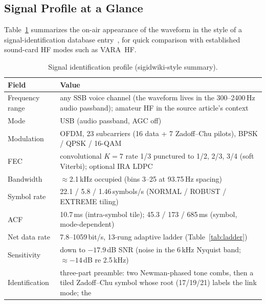 \subsection{Signal Profile at a Glance}
\label{sec:signal_profile}

Table~\ref{tab:signal_profile} summarizes the on-air appearance of the
waveform in the style of a signal-identification database
entry~\cite{sigidwiki_vara}, for quick comparison with established
sound-card HF modes such as VARA~HF.

\begin{table}[H]
    \centering
    \caption{Signal identification profile (sigidwiki-style summary).}
    \label{tab:signal_profile}
    \small
    \begin{tabular}{@{}lp{9.2cm}@{}}
    \toprule
    \textbf{Field} & \textbf{Value} \\
    \midrule
    Frequency range   & any SSB voice channel (the waveform lives in the
                        300--2400\,Hz audio passband); amateur HF in the
                        source article's context \\
    Mode              & USB (audio passband, AGC off) \\
    Modulation        & OFDM, 23 subcarriers (16 data + 7 Zadoff--Chu
                        pilots), BPSK / QPSK / 16-QAM \\
    FEC               & convolutional $K{=}7$ rate 1/3 punctured to
                        1/2, 2/3, 3/4 (soft Viterbi); optional IRA LDPC \\
    Bandwidth         & $\approx$2.1\,kHz occupied (bins 3--25 at
                        93.75\,Hz spacing) \\
    Symbol rate       & 22.1 / 5.8 / 1.46\,symbols/s
                        (NORMAL / ROBUST / EXTREME tiling) \\
    ACF               & 10.7\,ms (intra-symbol tile);
                        45.3 / 173 / 685\,ms (symbol, mode-dependent) \\
    Net data rate     & 7.8--1059\,bit/s, 13-rung adaptive ladder
                        (Table~\ref{tab:ladder}) \\
    Sensitivity       & down to $-17.9$\,dB SNR (noise in the 6\,kHz
                        Nyquist band; $\approx-14$\,dB re 2.5\,kHz) \\
    Identification    & three-part preamble: two Newman-phased tone
                        combs, then a tiled Zadoff--Chu symbol whose
                        root (17/19/21) labels the link mode; the

\end{tabular}
\end{table}
